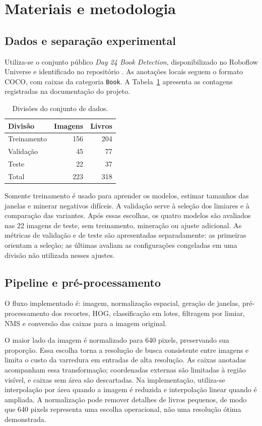 \documentclass[12pt,a4paper,twocolumn]{article}
\begin{document}
\section{Materiais e metodologia}
\subsection{Dados e separação experimental}
Utiliza-se o conjunto público \textit{Day 24 Book Detection}, disponibilizado no Roboflow Universe e identificado no repositório \cite{dataset}. As anotações locais seguem o formato COCO, com caixas da categoria \texttt{Book}. A Tabela~\ref{tab:dados} apresenta as contagens registradas na documentação do projeto.

\begin{table}[ht]
\centering\small
\caption{Divisões do conjunto de dados.}
\label{tab:dados}
\begin{tabular}{lrr}\toprule
Divisão & Imagens & Livros\\\midrule
Treinamento & 156 & 204\\
Validação & 45 & 77\\
Teste & 22 & 37\\\midrule
Total & 223 & 318\\\bottomrule
\end{tabular}
\end{table}

Somente treinamento é usado para aprender os modelos, estimar tamanhos das janelas e minerar negativos difíceis. A validação serve à seleção dos limiares e à comparação das variantes. Após essas escolhas, os quatro modelos são avaliados nas 22 imagens de teste, sem treinamento, mineração ou ajuste adicional. As métricas de validação e de teste são apresentadas separadamente: as primeiras orientam a seleção; as últimas avaliam as configurações congeladas em uma divisão não utilizada nesses ajustes.

\subsection{Pipeline e pré-processamento}
O fluxo implementado é: imagem, normalização espacial, geração de janelas, pré-processamento dos recortes, HOG, classificação em lotes, filtragem por limiar, NMS e conversão das caixas para a imagem original.

O maior lado da imagem é normalizado para 640 pixels, preservando sua proporção. Essa escolha torna a resolução de busca consistente entre imagens e limita o custo da varredura em entradas de alta resolução. As caixas anotadas acompanham essa transformação; coordenadas externas são limitadas à região visível, e caixas sem área são descartadas. Na implementação, utiliza-se interpolação por área quando a imagem é reduzida e interpolação linear quando é ampliada. A normalização pode remover detalhes de livros pequenos, de modo que 640 pixels representa uma escolha operacional, não uma resolução ótima demonstrada.
\end{document}
